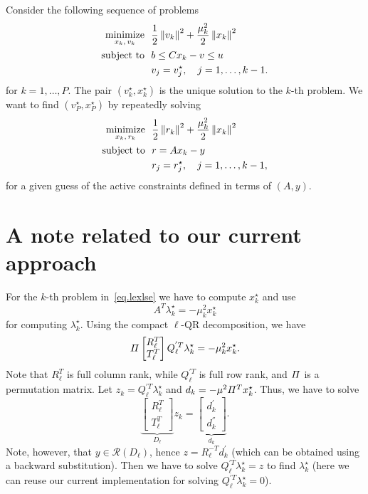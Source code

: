 \documentclass[12pt]{article}
\begin{document}
Consider the following sequence of problems
%
\begin{align}
  \begin{split}
    \mathop{\mbox{minimize}}_{x_k, \, v_k} \ \  & \frac{1}{2}\left\lVert v_k\right\rVert^2 + \frac{\mu_k^2}{2}\left\lVert x_k\right\rVert^2\\
    \mbox{subject to} \ \  & b \leq Cx_k - v \leq u \\
    & v_j = v_j^{\star}, \quad j=1,\dots,k-1.
  \end{split}
\end{align}
%
for $k=1,\dots,P$. The pair $(v_k^{\star},x_k^{\star})$ is the unique solution to the $k$-th
problem. We want to find $(v_P^{\star},x_P^{\star})$ by repeatedly solving
%
\begin{align}
  \begin{split} \label{eq.lexlse}
    \mathop{\mbox{minimize}}_{x_k, \, r_k} \ \  & \frac{1}{2}\left\lVert r_k\right\rVert^2 + \frac{\mu_k^2}{2}\left\lVert x_k\right\rVert^2\\
    \mbox{subject to} \ \  & r = Ax_k - y \\
    & r_j = r_j^{\star}, \quad j=1,\dots,k-1,
  \end{split}
\end{align}
%
for a given guess of the active constraints defined in terms of $(A,y)$.

\section{A note related to our current approach}

For the $k$-th problem in~\eqref{eq.lexlse} we have to compute $x_k^{\star}$ and use
%
\[
A^T\lambda_{k}^{\star} = -\mu_k^2x^{\star}_k
\]
%
for computing $\lambda_{k}^{\star}$. Using the compact $\ell$-QR decomposition, we have
%
\[
\mathnormal{\Pi}\begin{bmatrix}R_{\ell}^T \\ T_{\ell}^T\end{bmatrix}
Q_{\ell}^{'T}\lambda_{k}^{\star} = -\mu_k^2x^{\star}_k.
\]
%
Note that $R_{\ell}^T$ is full column rank, while $Q_{\ell}^{'T}$ is full row rank, and
$\mathnormal{\Pi}$ is a permutation matrix. Let $z_k = Q_{\ell}^{'T}\lambda_{k}^{\star}$ and $d_k =
-\mu^2\mathnormal{\Pi}^Tx^{\star}_k$. Thus, we have to solve
%
\[
\underbrace{\begin{bmatrix}R_{\ell}^T \\ T_{\ell}^T\end{bmatrix}}_{D_{\ell}}z_k = \underbrace{\begin{bmatrix} d_k^{'} \\ d_k^{''}\end{bmatrix}}_{d_k}.
\]
%
Note, however, that $y \in \mathcal{R}(D_{\ell})$, hence $z = R_{\ell}^{-T}d_k^{'}$ (which can be
obtained using a backward substitution). Then we have to solve $Q_{\ell}^{'T}\lambda_{k}^{\star} =
z$ to find $\lambda_{k}^{\star}$ (here we can reuse our current implementation for solving
$Q_{\ell}^{'T}\lambda_{k}^{\star} = 0$).
\end{document}
